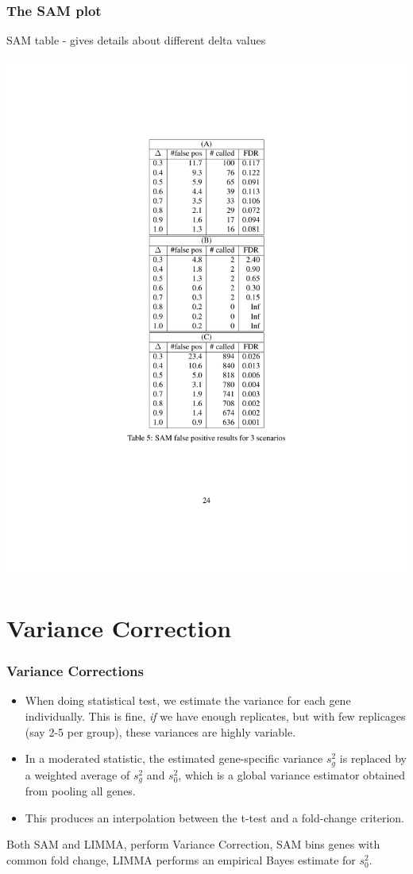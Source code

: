 \documentclass[pdf]{beamer}
\begin{document}
\begin{frame}
  \frametitle{The SAM plot}
  SAM table - gives details about different delta values
  \begin{center}
  \centering \includegraphics[scale=1.0]{figures/samtable.pdf}
  \end{center}
\end{frame}


\section{Variance Correction}
\begin{frame}
  \frametitle{Variance Corrections}
  \begin{itemize}
  \item When doing statistical test, we estimate the variance for each gene individually. This is fine, \textit{if} we have enough replicates, but with few replicages (say 2-5 per group), these variances are highly variable.
  \item In a moderated statistic, the estimated gene-specific variance $s^2_g$ is replaced by a weighted average of $s^2_g$ and $s^2_0$, which is a global variance estimator obtained from pooling all genes.
  \item This produces an interpolation between the t-test and a fold-change criterion.
  \end{itemize}
Both SAM and LIMMA, perform Variance Correction, SAM bins genes with common fold change, LIMMA performs an empirical Bayes estimate for $s^2_0$.
\end{frame}
\end{document}

